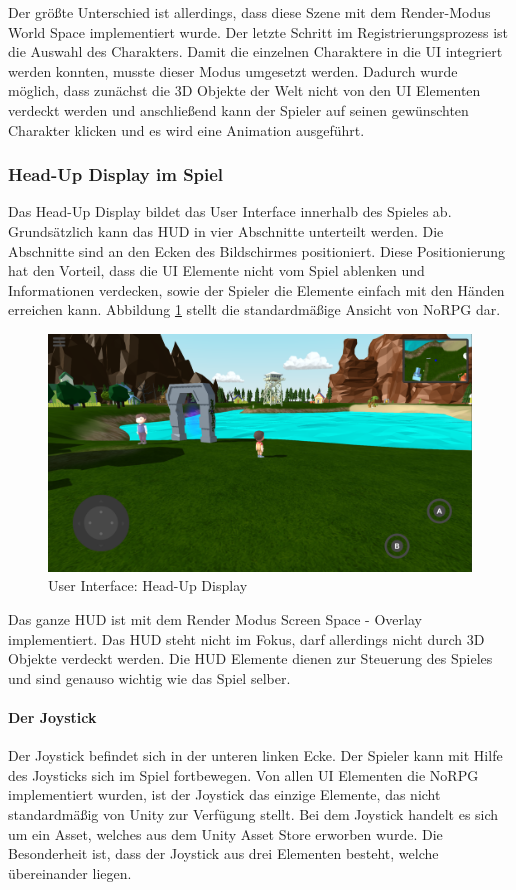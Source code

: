 			Der größte Unterschied ist allerdings, dass diese Szene mit dem Render-Modus World Space implementiert wurde. Der letzte Schritt im Registrierungsprozess ist die Auswahl des Charakters. Damit die einzelnen Charaktere in die UI integriert werden konnten, musste dieser Modus umgesetzt werden. Dadurch wurde möglich, dass zunächst die 3D Objekte der Welt nicht von den UI Elementen verdeckt werden und anschließend kann der Spieler auf seinen gewünschten Charakter klicken und es wird eine Animation ausgeführt. 
		
		\subsubsection{Head-Up Display im Spiel}
			Das Head-Up Display bildet das User Interface innerhalb des Spieles ab. Grundsätzlich kann das HUD in vier Abschnitte unterteilt werden. Die Abschnitte sind an den Ecken des Bildschirmes positioniert. Diese Positionierung hat den Vorteil, dass die UI Elemente nicht vom Spiel ablenken und Informationen verdecken, sowie der Spieler die Elemente einfach mit den Händen erreichen kann. Abbildung \ref{alwaysOnUI} stellt die standardmäßige Ansicht von NoRPG dar.
			
			\begin{figure}[htbp]
				\centering 
				\label{alwaysOnUI}
				\includegraphics[width=13cm]{pics/alwaysOnUI.png}
				\caption{User Interface: Head-Up Display}
			\end{figure}
		
			Das ganze HUD ist mit dem Render Modus Screen Space - Overlay implementiert. Das HUD steht nicht im Fokus, darf allerdings nicht durch 3D Objekte verdeckt werden. Die HUD Elemente dienen zur Steuerung des Spieles und sind genauso wichtig wie das Spiel selber.
			
			\paragraph{Der Joystick}
				Der Joystick befindet sich in der unteren linken Ecke. Der Spieler kann mit Hilfe des Joysticks sich im Spiel fortbewegen. Von allen UI Elementen die NoRPG implementiert wurden, ist der Joystick das einzige Elemente, das nicht standardmäßig von Unity zur Verfügung stellt. Bei dem Joystick handelt es sich um ein Asset, welches aus dem Unity Asset Store erworben wurde. Die Besonderheit ist, dass der Joystick aus drei Elementen besteht, welche übereinander liegen. 
				

